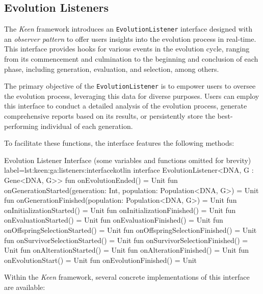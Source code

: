 \subsection{Evolution Listeners}
\label{sec:keen:ga:listeners}

  The \textit{Keen} framework introduces an \texttt{EvolutionListener} 
  interface designed with an \textit{observer pattern} to offer users insights 
  into the evolution process in real-time.
  This interface provides hooks for various events in the evolution cycle, 
  ranging from its commencement and culmination to the beginning and conclusion 
  of each phase, including generation, evaluation, and selection, among others.

  The primary objective of the \texttt{EvolutionListener} is to empower users 
  to oversee the evolution process, leveraging this data for diverse purposes. 
  Users can employ this interface to conduct a detailed analysis of the 
  evolution process, generate comprehensive reports based on its results, or 
  persistently store the best-performing individual of each generation.

  To facilitate these functions, the interface features the following methods:

  \begin{code}{
    Evolution Listener Interface (some variables and functions omitted for 
    brevity)
  }{label=lst:keen:ga:listeners:interface}{kotlin}
    interface EvolutionListener<DNA, G : Gene<DNA, G>> {
        fun onEvolutionEnded() = Unit
        fun onGenerationStarted(generation: Int, population: Population<DNA, G>) = Unit
        fun onGenerationFinished(population: Population<DNA, G>) = Unit
        fun onInitializationStarted() = Unit
        fun onInitializationFinished() = Unit
        fun onEvaluationStarted() = Unit
        fun onEvaluationFinished() = Unit
        fun onOffspringSelectionStarted() = Unit
        fun onOffspringSelectionFinished() = Unit
        fun onSurvivorSelectionStarted() = Unit
        fun onSurvivorSelectionFinished() = Unit
        fun onAlterationStarted() = Unit
        fun onAlterationFinished() = Unit
        fun onEvolutionStart() = Unit
        fun onEvolutionFinished() = Unit
    }
  \end{code}

  Within the \textit{Keen} framework, several concrete implementations of this 
  interface are available:

